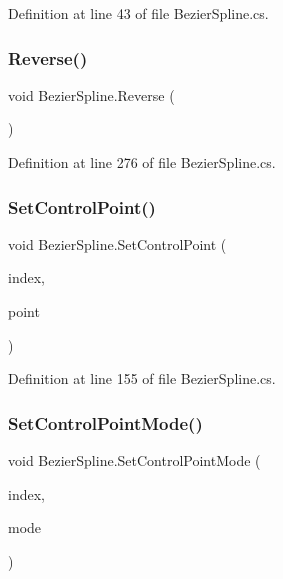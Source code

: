 Definition at line 43 of file Bezier\+Spline.\+cs.

\mbox{\label{class_bezier_spline_a06c69b2f3fed52bbd31ad05b93d5d336}} 
\subsubsection{\texorpdfstring{Reverse()}{Reverse()}}
{\footnotesize\ttfamily void Bezier\+Spline.\+Reverse (\begin{DoxyParamCaption}{ }\end{DoxyParamCaption})}



Definition at line 276 of file Bezier\+Spline.\+cs.

\mbox{\label{class_bezier_spline_aed423df0d5f7c31a82a617ad8ebc23e4}} 
\subsubsection{\texorpdfstring{Set\+Control\+Point()}{SetControlPoint()}}
{\footnotesize\ttfamily void Bezier\+Spline.\+Set\+Control\+Point (\begin{DoxyParamCaption}\item[{int}]{index,  }\item[{Vector3}]{point }\end{DoxyParamCaption})}



Definition at line 155 of file Bezier\+Spline.\+cs.

\mbox{\label{class_bezier_spline_a5c538c5216c5743de35ce9999760749c}} 
\subsubsection{\texorpdfstring{Set\+Control\+Point\+Mode()}{SetControlPointMode()}}
{\footnotesize\ttfamily void Bezier\+Spline.\+Set\+Control\+Point\+Mode (\begin{DoxyParamCaption}\item[{int}]{index,  }\item[{\mbox{\hyperlink{_bezier_spline_follower_8cs_a41ff1a7271616f36cab397d937ee41b0}{Bezier\+Control\+Point\+Mode}}}]{mode }\end{DoxyParamCaption})}



